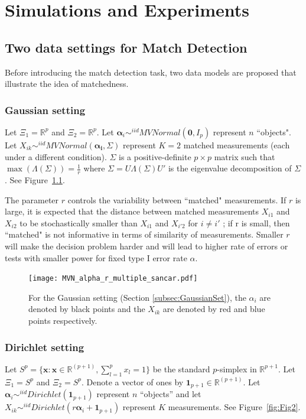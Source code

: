 \documentclass[12pt,oneside,final]{thesis}\usepackage[]{graphicx}\usepackage[]{color}
\begin{document}
\chapter{Simulations and Experiments}
\label{sec:simexp_results}


\section{Two data settings for Match Detection}


  Before introducing the match detection task, two data models are proposed that illustrate the idea of matchedness.
\subsection{Gaussian setting\label{subsec:GaussianSet}}
  Let    $\Xi_1 = \mathbb{R}^{p}$ and $\Xi_2 = \mathbb{R}^{p}$.
  Let $\bm{\alpha}_i \sim^{iid} MVNormal(\bm{0},I_p)$ represent $n$ ``objects".  Let $X_{ik} \sim^{iid} MVNormal(\bm{\alpha_i},\Sigma)$ represent $K=2$ matched measurements (each under a different condition).
  $\Sigma$ is a positive-definite $p\times p$ matrix such that  $\max(\Lambda(\Sigma))=\frac{1}{r} $ where $\Sigma=U\Lambda(\Sigma)U'$  is the eigenvalue decomposition of $\Sigma$. See Figure~\ref{fig:Fig1}.

The parameter $r$ controls the variability between ``matched" measurements. If $r$ is large, it is expected that the distance between matched measurements
$X_{i1}$ and $X_{i2}$ to be stochastically smaller than $X_{i1}$ and $X_{i'2}$ for $i \neq i'$ ; if r is small, then ``matched" is not informative in terms of similarity of measurements.
 Smaller $r$ will make the decision problem harder and will lead to higher rate of errors or tests with smaller power for fixed type I error rate $\alpha$.
  
    \begin{figure}
	\begin{center}
    \texttt{[image: MVN\_alpha\_r\_multiple\_sancar.pdf]}
    \caption{For the  Gaussian setting (Section \ref{subsec:GaussianSet}), the $\alpha_i$ are denoted by black points and the $X_{ik}$ are denoted by red and blue points respectively.}
\label{fig:Fig1}
	\end{center}
  \end{figure}

\subsection{Dirichlet setting\label{subsec:DirichletSet}}
Let $S^p=\{\bm{x}:\bm{x}\in\mathbb{R}^{(p+1)}, \sum_{l=1}^p{x_l}=1\}$ be the standard $p$-simplex in $\mathbb{R}^{p+1}$.
 Let $\Xi_1 = S^p$ and $\Xi_2 = S^p$.   Denote a vector of ones by $\bm{1}_{p+1}\in \mathbb{R}^{(p+1)}$.
  Let $\bm{\alpha}_i \sim^{iid} Dirichlet(\bm{1}_{p+1})$ represent $n$  ``objects'' and let $X_{ik} \sim^{iid} Dirichlet(r\bm{\alpha}_i+\bm{1}_{p+1})$ represent $K$ measurements. See Figure~\ref{fig:Fig2}.
\end{document}
